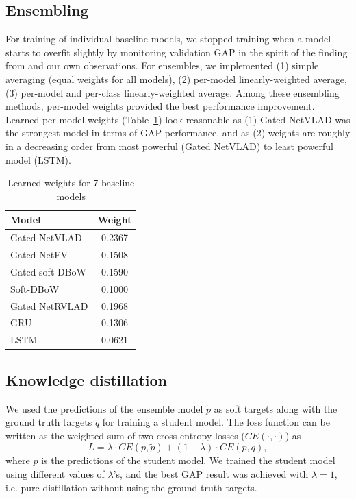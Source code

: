 \documentclass[runningheads]{llncs}
\begin{document}
\subsection{Ensembling} \label{sub:ensemble}
For training of individual baseline models, we stopped training when a model starts to overfit slightly by monitoring validation GAP in the spirit of the finding from \cite{bober2017} and our own observations.
For ensembles, we implemented (1) simple averaging (equal weights for all models), (2) per-model linearly-weighted average, (3) per-model and per-class linearly-weighted average.
Among these ensembling methods, per-model weights provided the best performance improvement.
Learned per-model weights (Table~\ref{tab:learned_weights}) look reasonable as (1) Gated NetVLAD was the strongest model in terms of GAP performance, and as (2) weights are roughly in a decreasing order from most powerful (Gated NetVLAD) to least powerful model (LSTM).

\begin{table}[h!]
  \begin{center}
    \caption{Learned weights for 7 baseline models}
    \label{tab:learned_weights}

    \begin{tabular}{ l | c }
     Model & Weight \\
    \hline
    \hline
            Gated NetVLAD & 0.2367 \\
    \hline
            Gated NetFV & 0.1508 \\
    \hline
            Gated soft-DBoW & 0.1590 \\
    \hline
            Soft-DBoW & 0.1000 \\
    \hline
            Gated NetRVLAD & 0.1968\\
    \hline
            GRU & 0.1306 \\
    \hline
            LSTM & 0.0621
    \end{tabular}
  \end{center}
\end{table}

\subsection{Knowledge distillation} \label{sub:distillation}
We used the predictions of the ensemble model $\tilde{p}$ as soft targets along with the ground truth targets $q$ for training a student model.
The loss function can be written as the weighted sum of two cross-entropy losses ($CE(\cdot,\cdot)$) as
\begin{equation}
L = \lambda \cdot CE(p, \tilde{p}) + (1-\lambda) \cdot CE(p,  q),
\end{equation}
where $p$ is the predictions of the student model.
We trained the student model using different values of $\lambda$’s, and the best GAP result was achieved with $\lambda = 1$, i.e. pure distillation without using the ground truth targets.
\end{document}
